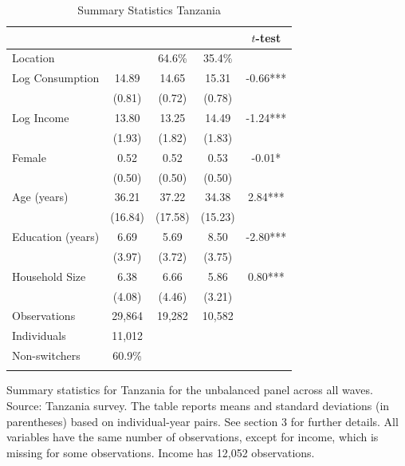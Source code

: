 \begin{table}[htbp] \centering \caption{Summary Statistics Tanzania}\label{tab:summary_stats_TZA_unb} \begin{threeparttable} \begin{tabular}{l cccc} \toprule
 &  &  &  & $t$-test \\
\midrule
Location &  &   64.6\% &   35.4\% &  \\  \addlinespace \addlinespace
Log Consumption & 14.89 & 14.65 & 15.31 & -0.66*** \\
 & (0.81) & (0.72) & (0.78) &  \\  \addlinespace
Log Income & 13.80 & 13.25 & 14.49 & -1.24*** \\
 & (1.93) & (1.82) & (1.83) &  \\  \addlinespace
Female & 0.52 & 0.52 & 0.53 & -0.01* \\
 & (0.50) & (0.50) & (0.50) &  \\  \addlinespace
Age (years) & 36.21 & 37.22 & 34.38 & 2.84*** \\
 & (16.84) & (17.58) & (15.23) &  \\  \addlinespace
Education (years) & 6.69 & 5.69 & 8.50 & -2.80*** \\
 & (3.97) & (3.72) & (3.75) &  \\  \addlinespace
Household Size & 6.38 & 6.66 & 5.86 & 0.80*** \\
 & (4.08) & (4.46) & (3.21) &  \\  \addlinespace


\cmidrule{2-5}
Observations & 29,864 & 19,282 & 10,582 &  \\  \addlinespace
Individuals & 11,012 &  &  &  \\
Non-switchers &   60.9\% &  &  &  \\  \addlinespace
\bottomrule \end{tabular} \begin{tablenotes}[flushleft] \footnotesize \item{Summary statistics for Tanzania for the unbalanced panel across all waves. Source: Tanzania survey. The table reports means and standard deviations (in parentheses) based on individual-year pairs. See section 3 for further details. All variables have the same number of observations, except for income, which is missing for some observations. Income has 12,052 observations.} \end{tablenotes} \end{threeparttable} \end{table}